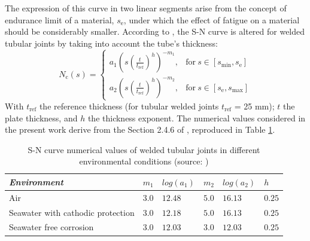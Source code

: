 The expression of this curve in two linear segments arise from the concept of endurance limit of a material, $s_{\mathrm{e}}$, under which the effect of fatigue on a material should be considerably smaller. 
According to \cite{dnv_fatigue_2016}, the S-N curve is altered for welded tubular joints by taking into account the tube's thickness:
\begin{equation}
N_{\mathrm{c}}(s) = \left\{
    \begin{array}{ll}
        a_{1} \left(s (\frac{t}{t_{\mathrm{ref}}})^h\right) ^{-m_1}, & \mbox{for}~ s \in [s_{\mathrm{min}}, s_{\mathrm{e}}]\\
        a_{2} \left(s (\frac{t}{t_{\mathrm{ref}}})^h\right)^{-m_2}, & \mbox{for}~ s \in [s_{\mathrm{e}}, s_{\mathrm{max}}]
    \end{array}
\right.
\end{equation}
With $t_{\mathrm{ref}}$ the reference thickness (for tubular welded joints $t_{\mathrm{ref}}$ = 25 mm); $t$ the plate thickness, and $h$ the thickness exponent. 
The numerical values considered in the present work derive from the Section 2.4.6 of \citet{dnv_fatigue_2016}, reproduced in Table \ref*{tab:sn_table}. 

\begin{table}[h]
    \centering
    \caption{S-N curve numerical values of welded tubular joints in different environmental conditions (source: \citealt{dnv_fatigue_2016})}
    \begin{tabular}{l|l|l|l|l|l}
     \hline
     \textit{Environment} & $m_1$ & $log(a_1)$ & $m_2$ & $log(a_2)$ & $h$\\
     \hline
     Air & $3.0$ & $12.48$ & $5.0$ & $16.13$ & $0.25$\\
     Seawater with cathodic protection & $3.0$ & $12.18$ & $5.0$ & $16.13$ & $0.25$\\ Seawater free corrosion & $3.0$ & $12.03$ & $3.0$ & $12.03$ & $0.25$\\ 
    \end{tabular}
    \label{tab:sn_table}
\end{table}

